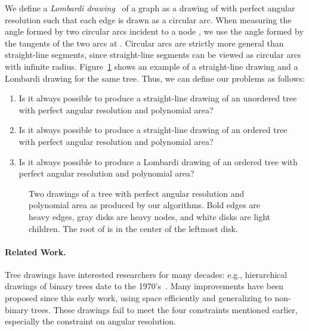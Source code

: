 \documentclass[11pt]{article}
\newcommand{\highlight}[1]{{\itshape #1}}
\begin{document}
We define a \highlight{Lombardi drawing}~\cite{degkn-ldg-12} of a graph  as a drawing of 
with perfect angular resolution such that each edge is drawn as a circular arc.
When measuring the angle formed by two circular arcs incident to a node , 
we use the angle formed by the tangents of the two arcs at .
Circular arcs are strictly more general than straight-line segments, since straight-line segments can be viewed as circular arcs
with infinite radius. Figure~\ref{fig:examples} shows an example of a
straight-line drawing and a Lombardi drawing for the same tree.
Thus, we can define our problems as follows:
\begin{enumerate}
\setlength{\itemsep}{2pt}
\item
Is it always possible to produce a straight-line drawing
of an unordered tree with perfect 
angular resolution and polynomial area?
\item
Is it always possible to produce a straight-line drawing
of an ordered tree with perfect 
angular resolution and polynomial area?
\item
Is it always possible to produce a Lombardi drawing
of an ordered tree with perfect 
angular resolution and polynomial area?
\end{enumerate}

\begin{figure}[tb]
  \centering
  \hfill
  \caption{Two drawings of a tree  with perfect
    angular resolution and polynomial area as produced by our
    algorithms. Bold edges are heavy edges, gray disks are heavy
    nodes, and white disks are light children. The root of  is in
    the center of the leftmost disk.}
  \label{fig:examples}
\end{figure}

\paragraph{Related Work.}
Tree drawings have interested researchers 
for many decades: e.g., hierarchical drawings of binary trees date to the 1970's~\cite{ws-td-79}. 
Many improvements have been proposed since this early work, using space efficiently and generalizing to 
non-binary trees\cite{bj-iw-02,cgkt-oaars-02,ggt-putdo-96,DBLP:journals/ijcga/GargR03,DBLP:journals/jgaa/GargR04,rt-td-81,Shin2000175,w-np-90}.  
These drawings fail to meet the four constraints mentioned earlier, especially the constraint on angular resolution.
\end{document}

